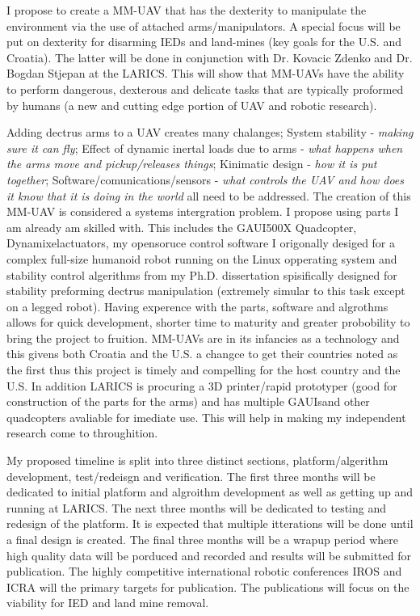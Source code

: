 \documentclass[12pt]{article}
\begin{document}
I propose to create a MM-UAV that has the dexterity to manipulate the environment via the use of attached  arms/manipulators. 
A special focus will be put on dexterity for disarming IEDs and land-mines (key goals for the U.S. and Croatia).  
The latter will be done in conjunction with Dr. Kovacic Zdenko and Dr. Bogdan Stjepan at the LARICS.  
This will show that MM-UAVs have the ability to perform dangerous, dexterous and delicate tasks that are typically proformed by humans (a new and cutting edge portion of UAV and robotic research).

Adding dectrus arms to a UAV creates many chalanges; 
System stability -  \textit{making sure it can fly};
Effect of dynamic inertal loads due to arms - \textit{what happens when the arms move and pickup/releases things};
Kinimatic design -  \textit{how it is put together};
Software/comunications/sensors -  \textit{what controls the UAV and how does it know that it is doing in the world} all need to be addressed.  
The creation of this MM-UAV is considered a systems intergration problem.  
I propose using parts I am already am skilled with.
This includes the GAUI\texttrademark 500X Quadcopter, Dynamixel\texttrademark actuators, my opensoruce control software I origonally desiged for a complex full-size humanoid robot running on the Linux opperating system and stability control algerithms from my Ph.D. dissertation spisifically designed for stability preforming dectrus manipulation (extremely simular to this task except on a legged robot).  
Having experence with the parts, software and algrothms allows for quick development, shorter time to maturity and greater probobility to bring the project to fruition.  
MM-UAVs are in its infancies as a technology and this givens both Croatia and the U.S. a changce to get their countries noted as the first thus this project is timely and compelling for the host country and the U.S.  
In addition LARICS is procuring a 3D printer/rapid prototyper (good for construction of the parts for the arms) and has multiple GAUIs\texttrademark and other quadcopters avaliable for imediate use.  This will help in making my independent research come to throughition.

My proposed timeline is split into three distinct sections, platform/algerithm development, test/redeisgn and verification.  
The first three months will be dedicated to initial platform and algroithm development as well as getting up and running at LARICS.  
The next three months will be dedicated to testing and redesign of the platform.  
It is expected that multiple itterations will be done until a final design is created.  
The final three months will be a wrapup period where high quality data will be porduced and recorded and results will be submitted for publication.  
The highly competitive international robotic conferences IROS and ICRA will the primary targets for publication.  
The publications will focus on the viability for IED and land mine removal.
\end{document}
